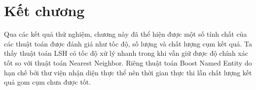 \section{Kết chương}
Qua các kết quả thử nghiệm, chương này đã thể hiện được một số tính chất của các thuật toán được đánh giá như tốc độ, số lượng và chất lượng cụm kết quả. Ta thấy thuật toán LSH có tốc độ xử lý nhanh trong khi vẫn giữ được độ chính xác tốt so với thuật toán Nearest Neighbor. Riêng thuật toán Boost Named Entity do hạn chế bởi thư viện nhận diện thực thể nên thời gian thực thi lẫn chất lượng kết quả gom cụm chưa được tốt.